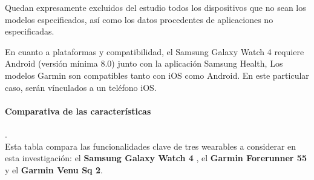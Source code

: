 Quedan expresamente excluidos del estudio todos los dispositivos que no sean los modelos especificados, así como los datos procedentes de aplicaciones no especificadas.


En cuanto a plataformas y compatibilidad, el Samsung Galaxy Watch 4 requiere Android (versión mínima 8.0) junto con la aplicación Samsung Health, 
Los modelos Garmin son compatibles tanto con iOS como Android. En este particular caso, serán vínculados a un teléfono iOS.


\paragraph{Comparativa de las características} . \\
Esta tabla compara las funcionalidades clave de tres wearables a considerar en esta investigación: el \textbf{Samsung Galaxy Watch 4} , el \textbf{Garmin Forerunner 55}  y el \textbf{Garmin Venu Sq 2}.

